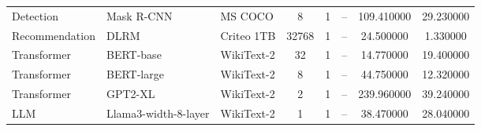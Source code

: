 \begin{table}
\begin{tabular}{lllccccc}
Detection & Mask R-CNN & MS COCO & 8 & 1 & -- & 109.410000 & 29.230000 \\
Recommendation & DLRM & Criteo 1TB & 32768 & 1 & -- & 24.500000 & 1.330000 \\
Transformer & BERT-base & WikiText-2 & 32 & 1 & -- & 14.770000 & 19.400000 \\
Transformer & BERT-large & WikiText-2 & 8 & 1 & -- & 44.750000 & 12.320000 \\
Transformer & GPT2-XL & WikiText-2 & 2 & 1 & -- & 239.960000 & 39.240000 \\
LLM & Llama3-width-8-layer & WikiText-2 & 1 & 1 & -- & 38.470000 & 28.040000 \\
\bottomrule
\end{tabular}
\end{table}
